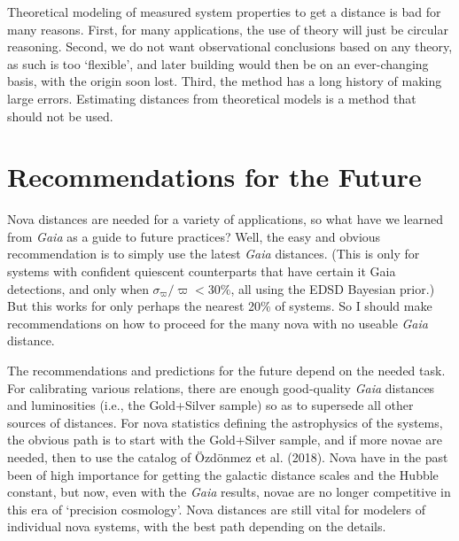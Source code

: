 \documentclass[a4paper,fleqn,usenatbib]{mnras}
\begin{document}
Theoretical modeling of measured system properties to get a distance is bad for many reasons.  First, for many applications, the use of theory will just be circular reasoning.  Second, we do not want observational conclusions based on any theory, as such is too `flexible', and later building would then be on an ever-changing basis, with the origin soon lost.  Third, the method has a long history of making large errors.  Estimating distances from theoretical models is a method that should not be used.  

\section{Recommendations for the Future}

Nova distances are needed for a variety of applications, so what have we learned from {\it Gaia} as a guide to future practices?  Well, the easy and obvious recommendation is to simply use the latest {\it Gaia} distances.  (This is only for systems with confident quiescent counterparts that have certain {it Gaia} detections, and only when $\sigma_{\varpi}/\varpi <30\%$, all using the EDSD Bayesian prior.)  But this works for only perhaps the nearest 20\% of systems.  So I should make recommendations on how to proceed for the many nova with no useable {\it Gaia} distance.

The recommendations and predictions for the future depend on the needed task.  For calibrating various relations, there are enough good-quality {\it Gaia} distances and luminosities (i.e., the Gold+Silver sample) so as to supersede all other sources of distances.  For nova statistics defining the astrophysics of the systems, the obvious path is to start with the Gold+Silver sample, and if more novae are needed, then to use the catalog of \"{O}zd\"{o}nmez et al. (2018).  Nova have in the past been of high importance for getting the galactic distance scales and the Hubble constant, but now, even with the {\it Gaia} results, novae are no longer competitive in this era of `precision cosmology'.  Nova distances are still vital for modelers of individual nova systems, with the best path depending on the details.
\end{document}
